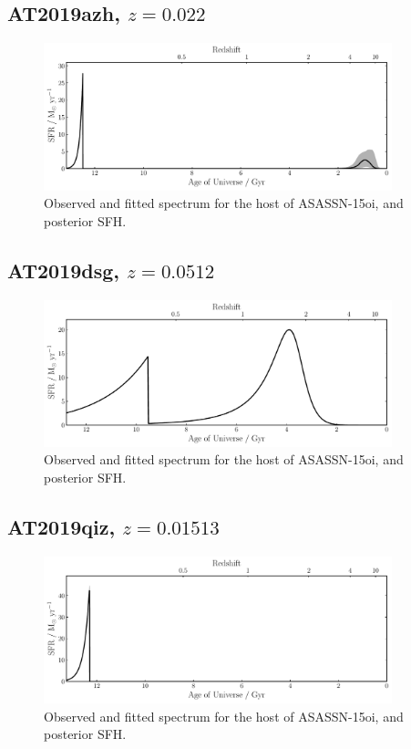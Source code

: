 \documentclass[a4paper,11pt]{article}
\begin{document}
\subsection{AT2019azh, $z=0.022$}\label{sec:AT2019azh}
\begin{figure}[h!]
\centering
  \includegraphics[width=0.9\textwidth]{../pipes/plots/r4_dblplaw_burst/AT2019azh_sfh.pdf}
  \caption{Observed and fitted spectrum for the host of ASASSN-15oi, and posterior SFH.}
  \label{}
\end{figure}


\newpage
\subsection{AT2019dsg, $z=0.0512$}\label{sec:AT2019dsg}
\begin{figure}[h!]
\centering
  \includegraphics[width=0.9\textwidth]{../pipes/plots/r4_dblplaw_burst/AT2019dsg_sfh.pdf}
  \caption{Observed and fitted spectrum for the host of ASASSN-15oi, and posterior SFH.}
  \label{}
\end{figure}


\newpage
\subsection{AT2019qiz, $z=0.01513$}\label{sec:AT2019qiz}
\begin{figure}[h!]
\centering
  \includegraphics[width=0.9\textwidth]{../pipes/plots/r4_dblplaw_burst/AT2019qiz_sfh.pdf}
  \caption{Observed and fitted spectrum for the host of ASASSN-15oi, and posterior SFH.}
  \label{}
\end{figure}
\end{document}
